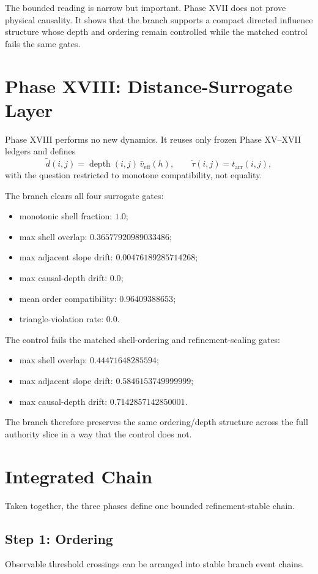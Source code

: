 \documentclass[11pt]{article}
\begin{document}
The bounded reading is narrow but important. Phase XVII does not prove physical causality. It shows that the branch supports a compact directed influence structure whose depth and ordering remain controlled while the matched control fails the same gates.

\section{Phase XVIII: Distance-Surrogate Layer}

Phase XVIII performs no new dynamics. It reuses only frozen Phase XV--XVII ledgers and defines
\[
\tilde d(i,j)=\operatorname{depth}(i,j)\,\bar v_{\mathrm{eff}}(h),
\qquad
\tilde \tau(i,j)=t_{\mathrm{arr}}(i,j),
\]
with the question restricted to monotone compatibility, not equality.

The branch clears all four surrogate gates:
\begin{itemize}
\item monotonic shell fraction: $1.0$;
\item max shell overlap: $0.36577920989033486$;
\item max adjacent slope drift: $0.00476189285714268$;
\item max causal-depth drift: $0.0$;
\item mean order compatibility: $0.96409388653$;
\item triangle-violation rate: $0.0$.
\end{itemize}

The control fails the matched shell-ordering and refinement-scaling gates:
\begin{itemize}
\item max shell overlap: $0.44471648285594$;
\item max adjacent slope drift: $0.5846153749999999$;
\item max causal-depth drift: $0.7142857142850001$.
\end{itemize}

The branch therefore preserves the same ordering/depth structure across the full authority slice in a way that the control does not.

\section{Integrated Chain}

Taken together, the three phases define one bounded refinement-stable chain.

\subsection*{Step 1: Ordering}
Observable threshold crossings can be arranged into stable branch event chains.
\end{document}
